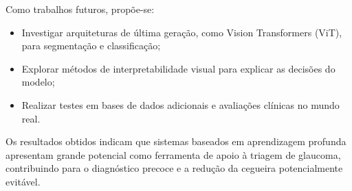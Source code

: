 \documentclass[12pt]{article}
\begin{document}
Como trabalhos futuros, propõe-se:
\begin{itemize}[noitemsep]
    \item Investigar arquiteturas de última geração, como Vision Transformers (ViT), para segmentação e classificação;
    \item Explorar métodos de interpretabilidade visual para explicar as decisões do modelo;
    \item Realizar testes em bases de dados adicionais e avaliações clínicas no mundo real.
\end{itemize}

Os resultados obtidos indicam que sistemas baseados em aprendizagem profunda apresentam grande potencial como ferramenta de apoio à triagem de glaucoma, contribuindo para o diagnóstico precoce e a redução da cegueira potencialmente evitável.







\newpage


% 



\end{document}
